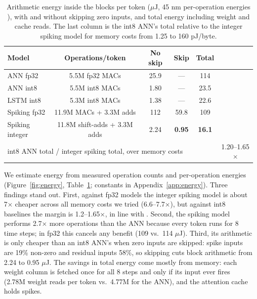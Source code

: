 \documentclass[10pt]{article}
\begin{document}
\begin{table}[t]
\centering
\caption{Arithmetic energy inside the blocks per token ($\mu$J, 45 nm per-operation energies
\citep{horowitz2014energy}), with and without skipping zero inputs, and total energy including weight and cache
reads. The last column is the int8 ANN's total relative to the integer spiking model for memory costs from 1.25 to
160 pJ/byte.}
\label{tab:energy}
\small
\begin{tabular}{lccccc}
\toprule
Model & Operations/token & No skip & Skip & Total & \\
\midrule
ANN fp32 & 5.5M fp32 MACs & 25.9 & --- & 114 & \\
ANN int8 & 5.5M int8 MACs & 1.80 & --- & 23.5 & \\
LSTM int8 & 5.3M int8 MACs & 1.38 & --- & 22.6 & \\
Spiking fp32 & 11.9M MACs + 3.3M adds & 112 & 59.8 & 109 & \\
Spiking integer & 11.8M shift-adds + 3.3M adds & 2.24 & \textbf{0.95} & \textbf{16.1} & \\
\midrule
\multicolumn{5}{l}{int8 ANN total / integer spiking total, over memory costs} & 1.20--1.65$\times$ \\
\bottomrule
\end{tabular}
\end{table}

We estimate energy from measured operation counts and per-operation energies \citep{horowitz2014energy}
(Figure~\ref{fig:energy}, Table~\ref{tab:energy}; constants in Appendix~\ref{app:energy}). Three findings stand
out. First, against fp32 models the integer spiking model is about 7$\times$ cheaper across all memory costs we
tried (6.6--7.7$\times$), but against int8 baselines the margin is 1.2--1.65$\times$, in line with
\citet{yan2024reconsidering}. Second, the spiking model performs 2.7$\times$ more operations than the ANN because
every token runs for 8 time steps; in fp32 this cancels any benefit (109 vs.\ 114 $\mu$J). Third, its arithmetic is
only cheaper than an int8 ANN's when zero inputs are skipped: spike inputs are 19\% non-zero and residual inputs
58\%, so skipping cuts block arithmetic from 2.24 to 0.95 $\mu$J. The savings in total energy come mostly from
memory: each weight column is fetched once for all 8 steps and only if its input ever fires (2.78M weight reads per
token vs.\ 4.77M for the ANN), and the attention cache holds spikes.

\end{document}
